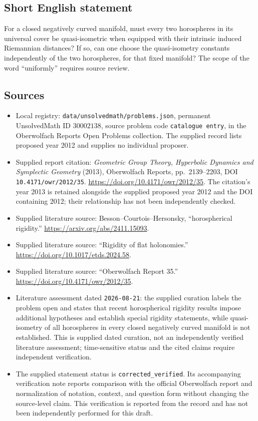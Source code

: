 \documentclass[11pt]{article}
\begin{document}
\subsection{Short English statement}
For a closed negatively curved manifold, must every two horospheres in its universal cover be quasi-isometric when equipped with their intrinsic induced Riemannian distances? If so, can one choose the quasi-isometry constants independently of the two horospheres, for that fixed manifold? The scope of the word ``uniformly'' requires source review.
\subsection{Sources}
\begin{itemize}
\item Local registry: \texttt{data/unsolvedmath/problems.json}, permanent UnsolvedMath ID \(30002138\), source problem code \texttt{catalogue entry}, in the Oberwolfach Reports Open Problems collection. The supplied record lists proposed year 2012 and supplies no individual proposer.
\item Supplied report citation: \emph{Geometric Group Theory, Hyperbolic Dynamics and Symplectic Geometry} (2013), Oberwolfach Reports, pp.~2139--2203, DOI \texttt{10.4171/owr/2012/35}. \url{https://doi.org/10.4171/owr/2012/35}. The citation's year 2013 is retained alongside the supplied proposed year 2012 and the DOI containing 2012; their relationship has not been independently checked.
\item Supplied literature source: Besson--Courtois--Hersonsky, ``horospherical rigidity.'' \url{https://arxiv.org/abs/2411.15093}.
\item Supplied literature source: ``Rigidity of flat holonomies.'' \url{https://doi.org/10.1017/etds.2024.58}.
\item Supplied literature source: ``Oberwolfach Report 35.'' \url{https://doi.org/10.4171/owr/2012/35}.
\item Literature assessment dated \texttt{2026-08-21}: the supplied curation labels the problem open and states that recent horospherical rigidity results impose additional hypotheses and establish special rigidity statements, while quasi-isometry of all horospheres in every closed negatively curved manifold is not established. This is supplied dated curation, not an independently verified literature assessment; time-sensitive status and the cited claims require independent verification.
\item The supplied statement status is \texttt{corrected\_verified}. Its accompanying verification note reports comparison with the official Oberwolfach report and normalization of notation, context, and question form without changing the source-level claim. This verification is reported from the record and has not been independently performed for this draft.
\end{itemize}
\end{document}

